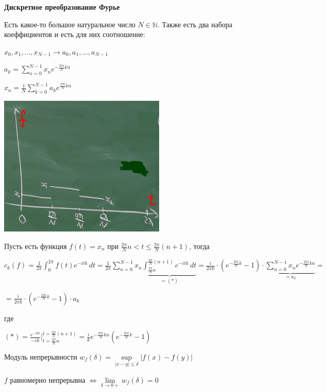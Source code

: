 \begin{theorem}
    \textbf{Дискретное преобразование Фурье}

    Есть какое-то большое натуральное число $N \in \mathbb{N}$. Также есть два набора коеффициентов и есть для них соотношение:

    $x_0, x_1, \ldots, x_{N - 1} \rightarrow a_0, a_1, \ldots, a_{N - 1}$

    $a_k = \sum\limits_{n = 0}^{N - 1} x_n e^{-\frac{2\pi i}{N} kn}$

    $x_n = \frac{1}{N} \sum\limits_{k = 0}^{N - 1} a_k e^{\frac{2\pi i}{N} kn}$ 

    \begin{center}
        \includegraphics[width=8cm]{assets/05-fourierreihe/dft.png}
    \end{center}

    Пусть есть функция $f(t) = x_n$ при $\frac{2\pi}{N}n < t \leqslant \frac{2\pi}{N} (n + 1)$, тогда

    $c_k (f) = \frac{1}{2\pi} \int_0^{2\pi} f(t) e^{-itk}\, dt =
    \frac{1}{2\pi} \sum\limits_{n = 0}^{N - 1} x_n \underbrace{\int_{\frac{2\pi}{N} n}^{\frac{2\pi}{N} (n + 1)} e^{-itk} \, dt}_{=(*)} = 
    \frac{i}{2 \pi k} \cdot \left( e^{- \frac{2 \pi i}{N} k} - 1 \right) \cdot \underbrace{\sum\limits_{n=0}^{N - 1} x_n e^{- \frac{2 \pi i}{N} kn}}_{=a_k} =$
    
    $= \frac{i}{2 \pi k} \cdot \left( e^{- \frac{2 \pi i}{N} k} - 1 \right) \cdot a_k$ 
 

    где

    $(*) = \frac{e^{-itk}}{-ik} \bigg |_{t=\frac{2\pi}{N} n}^{t=\frac{2\pi}{N} (n + 1)} = \frac{i}{k} e^{- \frac{2\pi i}{N} kn} (e^{- \frac{2 \pi i}{N} k} - 1)$
\end{theorem}


\begin{definition}
    Модуль непрерывности $w_f (\delta) = \sup\limits_{|x - y| \leqslant \delta} |f(x) - f(y)|$

    \begin{remark}
        $f$ равномерно непрерывна $\Longleftrightarrow \lim\limits_{\delta \to 0+} w_f (\delta) = 0$
    \end{remark}
\end{definition}

